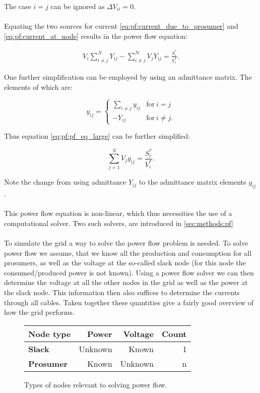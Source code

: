 The case $i = j$ can be ignored as $\Delta V_{ii} = 0$.\\
\\
Equating the two sources for current \autoref{eq:pf:current_due_to_prosumer}
and \autoref{eq:pf:current_at_node} results in the power flow equation:

\begin{equation}
    \begin{aligned}
        V_i \sum_{i \ne j}^N Y_{ij} - \sum_{i \ne j}^N V_j Y_{ij} = \frac{S_i^*}{V_i^*}.
        \label{eq:pf:pf_eq_large}
    \end{aligned}
\end{equation}

One further simplification can be employed by using an admittance matrix.
The elements of which are:

\begin{equation}
    y_{ij} =
    \begin{cases}
        \sum_{i \ne j} y_{ij} & \text{for} \ i = j\\
        -Y_{ij}               & \text{for} \ i \ne j.
    \end{cases}
    \label{eq:pf:admittance_matrix}
\end{equation}

Thus equation \ref{eq:pf:pf_eq_large} can be further simplified:

\begin{equation}
    \sum_{j=1}^N V_j y_{ij} = \frac{S_i^*}{V_i^*}.
    \label{eq:pf:full_pf_eq}
\end{equation}

Note the change from using admittance $Y_{ij}$ to the admittance matrix
elements $y_{ij}$.\\
\\
This power flow equation is non-linear, which thus necessities the use of a computational
solver. Two such solvers, are introduced in \autoref{sec:methods:pf}\\
\\
To simulate the grid a way to solve the power flow problem is needed. 
To solve power flow we assume,
that we know all the production and consumption for all prosumers,
as well as the voltage at the so-called slack
node (for this node the consumed/produced power is not known). Using a
power flow solver we can then determine the voltage
at all the other nodes in the grid as well as the power at the slack 
node. This information then also suffices to determine
the currents through all cables. Taken together these quantities 
give a fairly good overview of how the grid performs.

\begin{figure}[H]
    \centering
    \begin{tabular}{ l|r r r }
        Node type          & Power     & Voltage & Count \\ 
        \midrule
        \textbf{Slack}     & Unknown   & Known   & 1     \\  
        \textbf{Prosumer}  & Known     & Unknown & n    
    \end{tabular}
    \caption{
        Types of nodes relevant to solving power flow.
    }
\end{figure}
